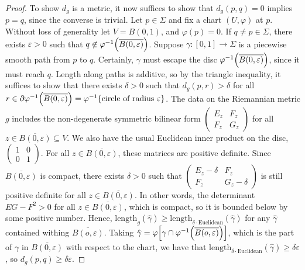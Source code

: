 \begin{proof}
	To show \( d_g \) is a metric, it now suffices to show that \( d_g(p,q) = 0 \) implies \( p = q \), since the converse is trivial.
	Let \( p \in \Sigma \) and fix a chart \( (U,\varphi) \) at \( p \).
	Without loss of generality let \( V = B(0,1) \), and \( \varphi(p) = 0 \).
	If \( q \neq p \in \Sigma \), there exists \( \varepsilon > 0 \) such that \( q \not\in \varphi^{-1} \qty(\overline{B(0,\varepsilon)}) \).
	Suppose \( \gamma \colon [0,1] \to \Sigma \) is a piecewise smooth path from \( p \) to \( q \).
	Certainly, \( \gamma \) must escape the disc \( \varphi^{-1} \qty(\overline{B(0,\varepsilon)}) \), since it must reach \( q \).
	Length along paths is additive, so by the triangle inequality, it suffices to show that there exists \( \delta > 0 \) such that \( d_g(p,r) > \delta \) for all \( r \in \partial \varphi^{-1} \qty(\overline{B(0,\varepsilon)}) = \varphi^{-1} \qty{ \text{circle of radius } \varepsilon } \).
	The data on the Riemannian metric \( g \) includes the non-degenerate symmetric bilinear form \( \begin{pmatrix}
		E_z & F_z \\
		F_z & G_z
	\end{pmatrix} \) for all \( z \in \overline{B(0,\varepsilon)} \subseteq V \).
	We also have the usual Euclidean inner product on the disc, \( \begin{pmatrix}
		1 & 0 \\
		0 & 1
	\end{pmatrix} \).
	For all \( z \in \overline{B(0,\varepsilon)} \), these matrices are positive definite.
	Since \( \overline{B(0,\varepsilon)} \) is compact, there exists \( \delta > 0 \) such that
	\( \begin{pmatrix}
		E_z - \delta & F_z          \\
		F_z          & G_z - \delta
	\end{pmatrix} \)
	is still positive definite for all \( z \in \overline{B(0,\varepsilon)} \).
	In other words, the determinant \( EG-F^2 > 0 \) for all \( z \in \overline{B(0,\varepsilon)} \), which is compact, so it is bounded below by some positive number.
	Hence, \( \mathrm{length}_g(\hat\gamma) \geq \mathrm{length}_{\delta \cdot \mathrm{Euclidean}}(\hat \gamma) \) for any \( \hat \gamma \) contained withing \( \overline{B(o,\varepsilon)} \).
	Taking \( \hat\gamma = \varphi \qty[ \gamma \cap \varphi^{-1}\qty(\overline{B(o,\varepsilon)}) ] \), which is the part of \( \gamma \) in \( \overline{B(0,\varepsilon)} \) with respect to the chart, we have that \( \mathrm{length}_{\delta \cdot \mathrm{Euclidean}}(\hat \gamma) \geq \delta \varepsilon \), so \( d_g(p,q) \geq \delta\varepsilon \).
\end{proof}

